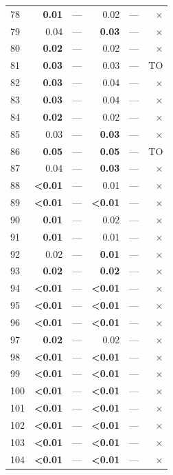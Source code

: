 \begin{longtable}{lr@{\hskip 4pt}l@{\hskip 12pt}r@{\hskip 4pt}l@{\hskip 12pt}r}
78 & \textbf{0.01} & --- & 0.02 & --- & $\times$ \\
79 & 0.04 & --- & \textbf{0.03} & --- & $\times$ \\
80 & \textbf{0.02} & --- & 0.02 & --- & $\times$ \\
81 & \textbf{0.03} & --- & 0.03 & --- & TO \\
82 & \textbf{0.03} & --- & 0.04 & --- & $\times$ \\
83 & \textbf{0.03} & --- & 0.04 & --- & $\times$ \\
84 & \textbf{0.02} & --- & 0.02 & --- & $\times$ \\
85 & 0.03 & --- & \textbf{0.03} & --- & $\times$ \\
86 & \textbf{0.05} & --- & \textbf{0.05} & --- & TO \\
87 & 0.04 & --- & \textbf{0.03} & --- & $\times$ \\
88 & \textbf{<0.01} & --- & 0.01 & --- & $\times$ \\
89 & \textbf{<0.01} & --- & \textbf{<0.01} & --- & $\times$ \\
90 & \textbf{0.01} & --- & 0.02 & --- & $\times$ \\
91 & \textbf{0.01} & --- & 0.01 & --- & $\times$ \\
92 & 0.02 & --- & \textbf{0.01} & --- & $\times$ \\
93 & \textbf{0.02} & --- & \textbf{0.02} & --- & $\times$ \\
94 & \textbf{<0.01} & --- & \textbf{<0.01} & --- & $\times$ \\
95 & \textbf{<0.01} & --- & \textbf{<0.01} & --- & $\times$ \\
96 & \textbf{<0.01} & --- & \textbf{<0.01} & --- & $\times$ \\
97 & \textbf{0.02} & --- & 0.02 & --- & $\times$ \\
98 & \textbf{<0.01} & --- & \textbf{<0.01} & --- & $\times$ \\
99 & \textbf{<0.01} & --- & \textbf{<0.01} & --- & $\times$ \\
100 & \textbf{<0.01} & --- & \textbf{<0.01} & --- & $\times$ \\
101 & \textbf{<0.01} & --- & \textbf{<0.01} & --- & $\times$ \\
102 & \textbf{<0.01} & --- & \textbf{<0.01} & --- & $\times$ \\
103 & \textbf{<0.01} & --- & \textbf{<0.01} & --- & $\times$ \\
104 & \textbf{<0.01} & --- & \textbf{<0.01} & --- & $\times$ \\

\end{longtable}
